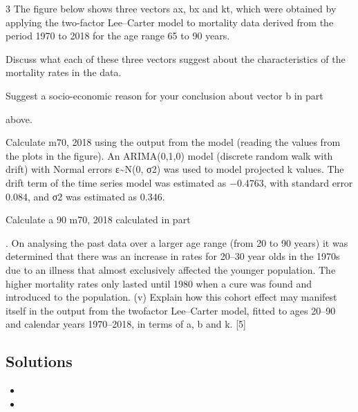 \documentclass[a4paper,12pt]{article}
\begin{document}


3 The figure below shows three vectors ax, bx and kt, which were obtained by applying
the two-factor Lee–Carter model to mortality data derived from the period 1970 to
2018 for the age range 65 to 90 years.
\item   Discuss what each of these three vectors suggest about the characteristics of
the mortality rates in the data. 

\item   Suggest a socio-economic reason for your conclusion about vector b in part \item  
above. 
\item  Calculate m70, 2018 using the output from the model (reading the values from
the plots in the figure). 
An ARIMA(0,1,0) model (discrete random walk with drift) with Normal errors
ε\sim N(0, σ2) was used to model projected k values. The drift term of the time series
model was estimated as −0.4763, with standard error 0.084, and σ2 was estimated as
0.346.
\item  Calculate a 90%
m70, 2018 calculated in part \item .
On analysing the past data over a larger age range (from 20 to 90 years) it was
determined that there was an increase in rates for 20–30 year olds in the 1970s due
to an illness that almost exclusively affected the younger population. The higher
mortality rates only lasted until 1980 when a cure was found and introduced to the
population.
(v) Explain how this cohort effect may manifest itself in the output from the twofactor
Lee–Carter model, fitted to ages 20–90 and calendar years 1970–2018,
in terms of a, b and k. [5]

\subsection*{Solutions}

\begin{itemize}
\item
\item
\end{itemize}
\end{document}

